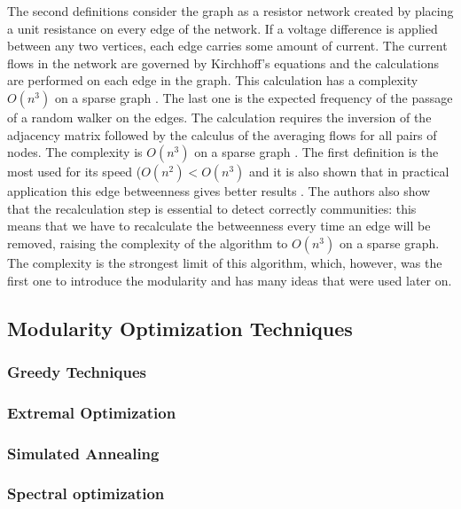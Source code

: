 The second definitions consider the graph as a resistor network created by placing a unit resistance on every edge of the network.
If a voltage difference is applied between any two vertices, each edge carries some amount of current.
The current flows in the network are governed by Kirchhoff’s equations and the calculations are performed on each edge in the graph.
This calculation has a complexity $O(n^3)$ on a sparse graph \cite{Newman_2004}. 
The last one is the expected frequency of the passage of a random walker on the edges. The calculation requires the inversion of the adjacency matrix followed by the calculus of the averaging flows for all pairs of nodes. The complexity is $O(n^3)$ on a sparse graph \cite{Newman_2004}. 
The first definition is the most used for its speed ($O(n^2) < O(n^3)$ and it is also shown that in practical application this edge betweenness gives better results \cite{Newman_2004}. The authors also show that the recalculation step is essential to detect correctly communities: this means that we have to recalculate the betweenness every time an edge will be removed, raising the complexity of the algorithm to $O(n^3)$ on a sparse graph. The complexity is the strongest limit of this algorithm, which, however, was the first one to introduce the modularity and has many ideas that were used later on.\\

\subsection{Modularity Optimization Techniques}
\subsubsection{Greedy Techniques}
\subsubsection{Extremal Optimization}
\subsubsection{Simulated Annealing}
\subsubsection{Spectral optimization}